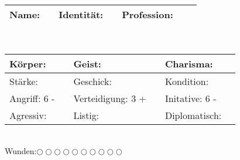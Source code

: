 \documentclass[oneside,a4paper]{report}
\begin{document}
\begin{tabular}{| l l | l l | l l l|}
Name:&\hspace{100pt} &Identität:&\hspace{50pt} &Profession:&\hspace{300pt}&\\\hline
\end{tabular}
\\
\begin{tabular}{| l l | l l | l l |}
\hline
Körper:&\hspace{50pt} &Geist:&\hspace{50pt} &Charisma: &\hspace{50pt}\\\hline
Stärke:&\hspace{50pt} &Geschick:&\hspace{50pt}&Kondition:&\hspace{50pt}\\\hline
Angriff: 6 -&\hspace{10pt}&Verteidigung: 3 +&\hspace{10pt}&Initative: 6 -&\hspace{10pt}\\\hline
Agressiv:&\hspace{50pt} &Listig:&\hspace{50pt}&Diplomatisch:&\hspace{50pt}\\\hline
\end{tabular}
\\Wunden:$\bigcirc\bigcirc\bigcirc\bigcirc\bigcirc\bigcirc\bigcirc\bigcirc\bigcirc\bigcirc$
\end{document}
